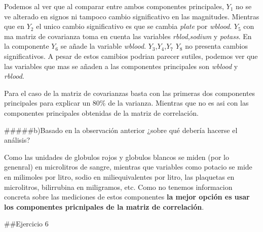 \documentclass[]{article}
\begin{document}
Podemos al ver que al comparar entre ambos componentes principales,
\(Y_{1}\) no se ve alterado en signos ni tampoco cambio significativo en
las magnitudes. Mientras que en \(Y_{2}\) el unico cambio significativo
es que se cambia \emph{plate} por \emph{wblood}. \(Y_{5}\) con ma matriz
de covarianza toma en cuenta las variables \emph{rblod},\emph{sodium} y
\emph{potass}. En la componente \(Y_{6}\) se añade la variable
\emph{wblood}. \(Y_{3}\),\(Y_{4}\),\(Y_{7}\) \(Y_{8}\) no presenta
cambios significativos. A pesar de estos camibios podrian parecer
sutiles, podemos ver que las variables que mas se añaden a las
componentes principales son \emph{wblood} y \emph{rblood}.

Para el caso de la matriz de covarianzas basta con las primeras dos
componentes principales para explicar un \(80\%\) de la varianza.
Mientras que no es asi con las componentes principales obtenidas de la
matriz de correlación.

\#\#\#\#\#b)Basado en la observación anterior ¿sobre qué debería hacerse
el análisis?

Como las unidades de globulos rojos y globulos blancos se miden (por lo
genenral) en microlitros de sangre, mientras que variables como potacio
se mide en milimoles por litro, sodio en miliequivalentes por litro, las
plaquetas en microlitros, bilirrubina en miligramos, etc. Como no
tenemos informacion concreta sobre las mediciones de estos componentes
\textbf{la mejor opción es usar los componentes pricnipales de la matriz
de correlación}.

\#\#Ejercicio 6
\end{document}
